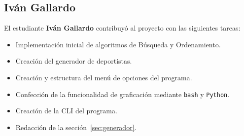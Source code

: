 \subsection{Iván Gallardo}
El estudiante \textbf{Iván Gallardo} contribuyó al proyecto con las siguientes tareas:
\begin{itemize}
    \item Implementación inicial de algoritmos de Búsqueda y Ordenamiento.
    \item Creación del generador de deportistas.
    \item Creación y estructura del menú de opciones del programa.
    \item Confección de la funcionalidad de graficación mediante \texttt{bash} y \texttt{Python}.
    \item Creación de la CLI del programa.
    \item Redacción de la sección~\ref{sec:generador}.
\end{itemize}